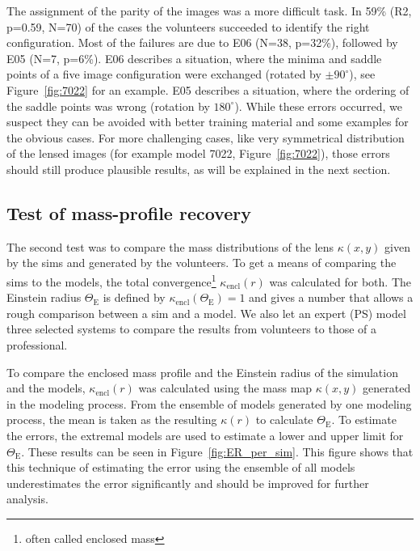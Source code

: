\documentclass[12pt,preprint]{aastex}
\newcommand{\ERg}[1][]{$\Theta_{\text{E#1}}$\xspace} %
\newcommand{\kenc}[1][r]{$\kappa_\text{encl}(#1)$\xspace}
\newcommand{\kap}[1][r]{$\kappa(#1)$\xspace}
\newcommand{\figref}[1]{Figure~\ref{fig:#1}}
\newcommand{\dgr}{^{\circ}}
\begin{document}
The assignment of the parity of the images was a more difficult task.
In 59\% (R2, p=0.59, N=70) of the cases the volunteers succeeded to identify the right configuration.
Most of the failures are due to E06 (N=38, p=32\%), followed by E05 (N=7, p=6\%).
E06 describes a situation, where the minima and saddle points of a five image configuration were exchanged (rotated by $\pm90\dgr$), see \figref{7022} for an example.
E05 describes a situation, where the ordering of the saddle points was wrong (rotation by $180\dgr$).
While these errors occurred, we suspect they can be avoided with better training material and some examples for the obvious cases.
For more challenging cases, like very symmetrical distribution of the lensed images (for example model 7022, \figref{7022}), those errors should still produce plausible results, as will be explained in the next section.



\subsection{Test of mass-profile recovery} \label{sec:tests.t2}

The second test was to compare the mass distributions of the lens $\kappa(x, y)$ given by the sims and generated by the volunteers.
To get a means of comparing the sims to the models, the total convergence\footnote{often called enclosed mass} $\kappa_{\text{encl}}(r)$ was calculated for both.
The Einstein radius $\Theta_\text{E}$ is defined by $\kappa_{\text{encl}}(\Theta_\text{E})=1$ and gives a number that allows a rough comparison between a sim and a model.
We also let an expert (PS) model three selected systems to compare the results from volunteers to those of a professional.


To compare the enclosed mass profile and the Einstein radius of the simulation and the models, \kenc was calculated using the mass map \kap[x,y] generated in the modeling process.
From the ensemble of models generated by one modeling process, the mean is taken as the resulting $\kappa(r)$ to calculate \ERg.
To estimate the errors, the extremal models are used to estimate a lower and upper limit for \ERg.
These results can be seen in \figref{ER_per_sim}.
This figure shows that this technique of estimating the error using the ensemble of all models underestimates the error significantly and should be improved for further analysis.
\end{document}
